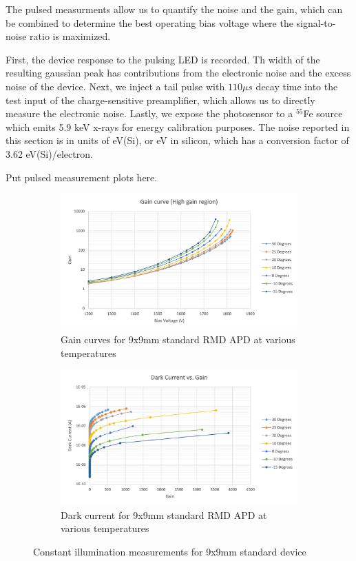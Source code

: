 The pulsed measurments allow us to quantify the noise and the gain, which can be combined to determine the best operating bias voltage where the signal-to-noise ratio is maximized.  

First, the device response to the pulsing LED is recorded.  Th width of the resulting gaussian peak has contributions from the electronic noise and the excess noise of the device.  Next, we inject a tail pulse with $110\mu s$ decay time into the test input of the charge-sensitive preamplifier, which allows us to directly measure the electronic noise.  Lastly, we expose the photosensor to a $^{55}$Fe source which emits 5.9 keV x-rays for energy calibration purposes.  The noise reported in this section is in units of eV(Si), or eV in silicon, which has a conversion factor of 3.62 eV(Si)/electron.  

Put pulsed measurement plots here.

\begin{figure}
  \centering
  \begin{subfigure}[h]{0.9\linewidth}
    \includegraphics[width=\linewidth]{Figures/StdGainCurves.png}
    \caption{Gain curves for 9x9mm standard RMD APD at various temperatures}
  \end{subfigure}

  \begin{subfigure}[h]{0.9\linewidth}
    \includegraphics[width=\linewidth]{Figures/StdDarkCurrentVsGain.png}
    \caption{Dark current for 9x9mm standard RMD APD at various temperatures}
  \end{subfigure}
  \label{fig:stdconst}
  \caption{Constant illumination measurements for 9x9mm standard device}
\end{figure}

